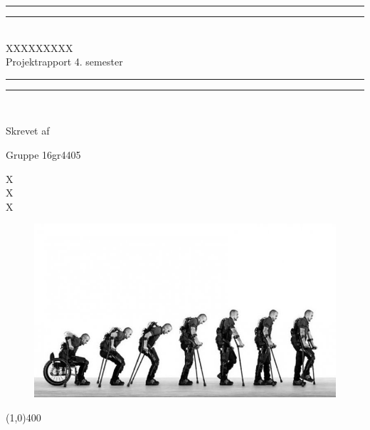 \begin{center}
\vspace*{\baselineskip}
\rule{\textwidth}{1.6pt}\vspace*{-\baselineskip}\vspace*{2pt} %
\rule{\textwidth}{0.4pt}\\[\baselineskip] %

{\huge XXXXXXXXX\\[0.3\baselineskip] \LARGE Projektrapport 4. semester}\\[0.2\baselineskip] %

\rule{\textwidth}{0.4pt}\vspace*{-\baselineskip}\vspace{3.2pt} %
\rule{\textwidth}{1.6pt}\\[\baselineskip] %
\vspace*{3\baselineskip}



Skrevet af \\
{\Large Gruppe 16gr4405\par}
\end{center} %
{\color{white}X \\ X \\ X \\}
\begin{figure}[H]
	\centering
	\begin{minipage}[b]{1\textwidth}
		\includegraphics[width=\textwidth]{figures/Forside}
	\end{minipage}
	\hfill
\end{figure}

\begin{center}
\line(1,0){400}
\end{center}
